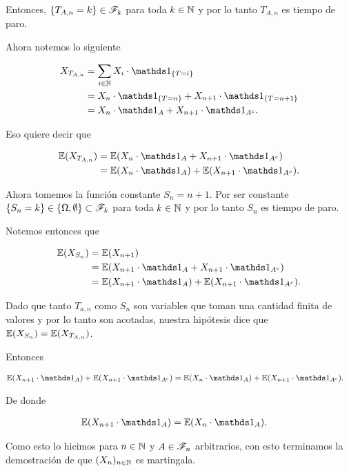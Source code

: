 	Entonces, $\{ T_{A,n} = k\} \in \mathscr{F}_k$ para toda $k \in \mathbb{N}$ y por lo tanto $T_{A,n}$ es tiempo de paro.\par\null

    Ahora notemos lo siguiente
    
    \begin{align}
    	X_{T_{A,n}} 	&=		\sum_{i \in \N} X_i \cdot  \indic_{\{T=i\}}						\\
    					&=		X_n \cdot  \indic_{\{T=n\}} + X_{n+1} \cdot  \indic_{\{T=n+1\}}	\\
    					&=		X_n \cdot  \indic_{A} + X_{n+1} \cdot  \indic_{A^c}.
    \end{align}\par\null
    
    Eso quiere decir que
    
    \begin{align}
    	\E(X_{T_{A,n}}) 	&=	\E(X_n \cdot  \indic_{A} + X_{n+1} \cdot  \indic_{A^c})		\\
							&=	\E(X_n \cdot  \indic_{A}) + \E(X_{n+1} \cdot  \indic_{A^c}).
    \end{align}\par\null
    
    Ahora tomemos la función constante $S_n = n+1$. Por ser constante \\
    $\{S_n = k\} \in \{ \Omega, \emptyset\} \subset \mathscr{F}_k$ para toda $k \in \mathbb{N}$
    y por lo tanto $S_n$ es tiempo de paro.\par\null
    
    Notemos entonces que
    
    \begin{align}
    	\E(X_{S_n}) 	&= 		\E(X_{n+1}) 													\\
    					&=		\E(X_{n+1} \cdot \indic_A + X_{n+1} \cdot \indic_{A^c}) 		\\
    					&=		\E(X_{n+1} \cdot \indic_A) +\E( X_{n+1} \cdot \indic_{A^c}). 
    \end{align}
    
    Dado que tanto $T_{a,n}$ como $S_n$ son variables que toman una cantidad finita de valores y por lo tanto son acotadas, 
    nuestra hipótesis dice que \\
    $\mathbb{E}(X_{S_n}) = \mathbb{E}(X_{T_{A,n}})$.\par\null
    
    Entonces
    
    \begin{align}
		\E(X_{n+1} \cdot \indic_A) +\E( X_{n+1} \cdot \indic_{A^c}) &=  \E(X_n \cdot  \indic_{A}) + \E(X_{n+1} \cdot  \indic_{A^c}).
    \end{align}\par\null
    
    De donde
    
    \begin{align}
			\E(X_{n+1} \cdot \indic_A) &=	\E(X_n \cdot  \indic_{A}).
    \end{align}\par\null
    
    Como esto lo hicimos para $n \in \mathbb{N}$ y $A \in \mathscr{F}_n$ arbitrarios, con esto terminamos la demostración de que $(X_n)_{n \in \mathbb{N}}$ es
    martingala.